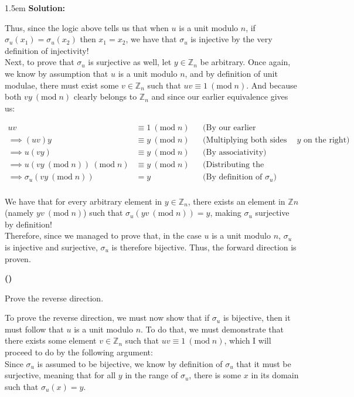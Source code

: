 \documentclass{article}
\newenvironment{solution}{
	\vspace{.5em}
	\par
	\begin{adjustwidth}{1.5em}{}
	\textbf{{Solution:}}
	\par
	\vspace{.5em}
}{
	\vspace{1em}
	\end{adjustwidth}
	\setcounter{step}{0}
}
\newcounter{step}
\renewcommand{\thestep}{\Roman{step}}
\newenvironment{step}{
	\refstepcounter{step}
	\vspace{1em}\par\noindent
	\ignorespaces\noindent\textbf{(\thestep)}
	\ignorespaces
}{
	\par
	\vspace{1.5em}
}
\renewcommand{\mod}[1]{\ (\text{mod} \; {#1})}
\begin{document}
\begin{solution}
	Thus, since the logic above tells us that when $u$ is a unit modulo $n$, if $\sigma_{u}(x_1) = \sigma_{u}(x_2)$ then $x_1 = x_2$, we have that $\sigma_{u}$ is injective by the very definition of injectivity! \\

	Next, to prove that $\sigma_{u}$ is surjective as well, let $y \in \mathbb{Z}_{n}$ be arbitrary. Once again, we know by assumption that $u$ is a unit modulo $n$, and by definition of unit modulae, there must exist some $v \in \mathbb{Z}_{n}$ such that $uv \equiv 1 \mod{n}$. And because both $vy \mod{n}$ clearly belongs to $\mathbb{Z}_{n}$ and since our earlier equivalence gives us:

	\begin{align*}
		uv &\equiv 1 \mod{n} &&\text{(By our earlier equivalence)} \\
		\implies (uv)y &\equiv y \mod{n} &&\text{(Multiplying both sides by $y$ on the right)} \\
		\implies u(vy) &\equiv y \mod{n} &&\text{(By associativity)} \\
		\implies u(vy \mod n) \mod{n} &\equiv y \mod{n} &&\text{(Distributing the modulus)} \\
		\implies \sigma_{u}(vy \mod {n}) &= y &&\text{(By definition of $\sigma_{u}$)} \\
	\end{align*}

	We have that for every arbitrary element in $y \in \mathbb{Z}_{n}$, there exists an element in $\mathbb{Z}{n}$ (namely $yv \mod{n}$) such that $\sigma_{u}(yv \mod{n}) = y$, making $\sigma_{u}$ surjective by definition! \\

	Therefore, since we managed to prove that, in the case $u$ is a unit modulo $n$, $\sigma_{u}$ is injective and surjective, $\sigma_{u}$ is therefore bijective. Thus, the forward direction is proven.

	\begin{step}
		Prove the reverse direction.
	\end{step}

	To prove the reverse direction, we must now show that if $\sigma_{u}$ is bijective, then it must follow that $u$ is a unit modulo $n$. To do that, we must demonstrate that there exists some element $v \in \mathbb{Z}_{n}$ such that $uv \equiv 1 \mod{n}$, which I will proceed to do by the following argument: \\

	Since $\sigma_{u}$ is assumed to be bijective, we know by definition of $\sigma_{u}$ that it must be surjective, meaning that for all $y$ in the range of $\sigma_{u}$, there is some $x$ in its domain such that $\sigma_{u}(x) = y$. \\


\end{solution}
\end{document}
